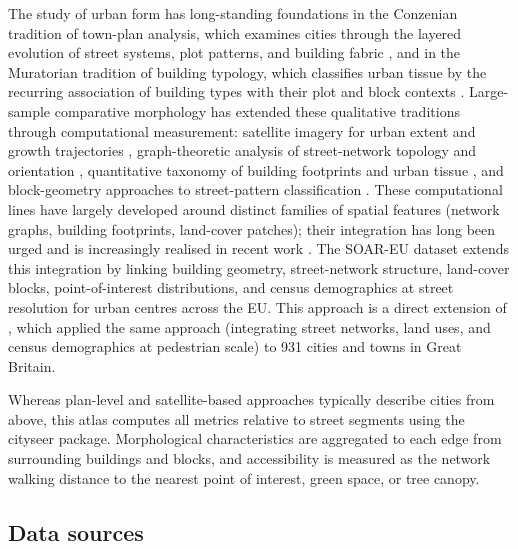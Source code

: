 \documentclass[review,authoryear]{elsarticle}
\begin{document}
The study of urban form has long-standing foundations in the Conzenian tradition of town-plan analysis, which examines cities through the layered evolution of street systems, plot patterns, and building fabric \citep{whitehand2001british}, and in the Muratorian tradition of building typology, which classifies urban tissue by the recurring association of building types with their plot and block contexts \citep{caniggia2001architectural, oliveira2016urban}. Large-sample comparative morphology has extended these qualitative traditions through computational measurement: satellite imagery for urban extent and growth trajectories \citep{angel2016atlas}, graph-theoretic analysis of street-network topology and orientation \citep{boeing2019urban, boeing2020multi}, quantitative taxonomy of building footprints and urban tissue \citep{fleischmann2022morphological, dibble2019origin}, and block-geometry approaches to street-pattern classification \citep{louf2014typology}. These computational lines have largely developed around distinct families of spatial features (network graphs, building footprints, land-cover patches); their integration has long been urged \citep{moudon1997urban} and is increasingly realised in recent work \citep{araldi2019street, yap2023global}. The SOAR-EU dataset extends this integration by linking building geometry, street-network structure, land-cover blocks, point-of-interest distributions, and census demographics at street resolution for urban centres across the EU. This approach is a direct extension of \citet{simons2021thesis}, which applied the same approach (integrating street networks, land uses, and census demographics at pedestrian scale) to 931 cities and towns in Great Britain.

Whereas plan-level and satellite-based approaches typically describe cities from above, this atlas computes all metrics relative to street segments using the cityseer \citep{simons2023cityseer} package. Morphological characteristics are aggregated to each edge from surrounding buildings and blocks, and accessibility is measured as the network walking distance to the nearest point of interest, green space, or tree canopy.

\subsection{Data sources}
\end{document}
